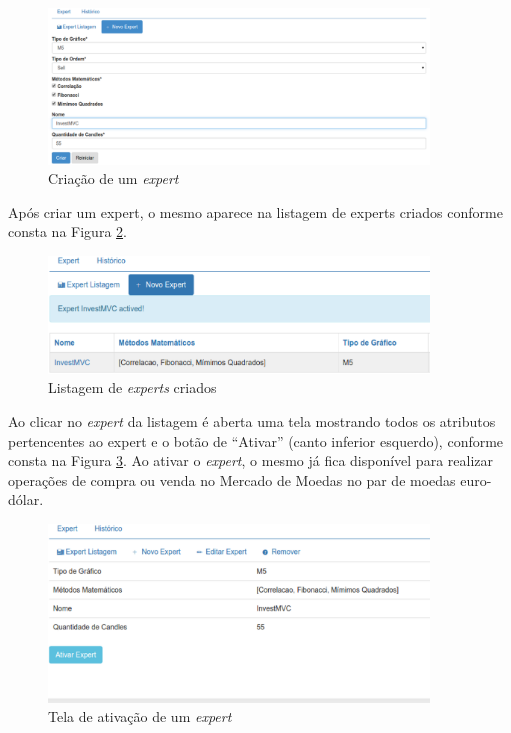 \begin{figure}[H]
\centering
\includegraphics[width=0.9\textwidth]{figuras/criarExpert}
\caption{Criação de um \textit{expert}}
\label{criarExpert}
\end{figure}

Após criar um expert, o mesmo aparece na listagem de experts criados conforme consta na Figura \ref{ativado}.

\begin{figure}[H]
\centering
\includegraphics[width=0.9\textwidth]{figuras/ativado}
\caption{Listagem de \textit{experts} criados}
\label{ativado}
\end{figure}

Ao clicar no \textit{expert} da listagem é aberta uma tela mostrando todos os atributos pertencentes ao expert e o botão de “Ativar” (canto inferior esquerdo), conforme consta na Figura \ref{ativar}. Ao ativar o \textit{expert}, o mesmo já fica disponível para realizar operações de compra ou venda no Mercado de Moedas no par de moedas euro-dólar.

\begin{figure}[H]
\centering
\includegraphics[width=0.9\textwidth]{figuras/ativar}
\caption{Tela de ativação de um \textit{expert}}
\label{ativar}
\end{figure}

